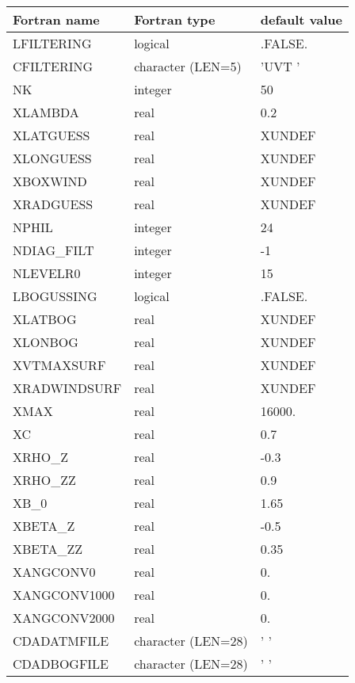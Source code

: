 \begin{center}
\begin{tabular} {|l|l|l|}
\hline
Fortran name & Fortran type & default value\\
\hline
\hline
LFILTERING     & logical  & .FALSE.    \\
CFILTERING     & character (LEN=5)  & 'UVT  '  \\
NK             & integer  & 50  \\
XLAMBDA        & real & 0.2     \\
XLATGUESS      & real & XUNDEF  \\
XLONGUESS      & real & XUNDEF  \\
XBOXWIND       & real & XUNDEF  \\
XRADGUESS      & real & XUNDEF  \\
NPHIL          & integer  & 24  \\
NDIAG\_FILT    & integer  & -1  \\
NLEVELR0       & integer  & 15  \\
\hline
LBOGUSSING     & logical    & .FALSE.   \\
XLATBOG        & real & XUNDEF  \\
XLONBOG        & real & XUNDEF  \\
XVTMAXSURF     & real & XUNDEF  \\
XRADWINDSURF   & real & XUNDEF  \\
XMAX           & real & 16000.  \\
XC             & real & 0.7  \\
XRHO\_Z        & real & -0.3  \\
XRHO\_ZZ       & real & 0.9   \\
XB\_0          & real & 1.65    \\
XBETA\_Z       & real & -0.5   \\
XBETA\_ZZ      & real & 0.35   \\
XANGCONV0      & real & 0.   \\
XANGCONV1000   & real & 0.   \\
XANGCONV2000   & real & 0.   \\
CDADATMFILE    & character (LEN=28) & ' '           \\
CDADBOGFILE    & character (LEN=28) & ' '           \\
\hline
\end{tabular}
\end{center}

